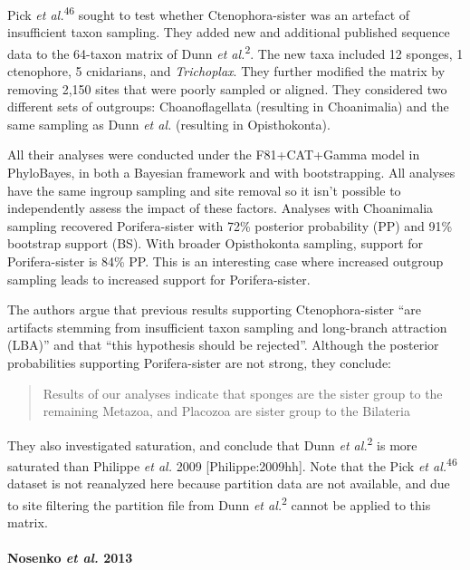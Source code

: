 \documentclass[]{article}
\let\oldparagraph\paragraph
\renewcommand{\paragraph}[1]{\oldparagraph{#1}\mbox{}}
\begin{document}
Pick \emph{et al.}\textsuperscript{46} sought to test whether
Ctenophora-sister was an artefact of insufficient taxon sampling. They
added new and additional published sequence data to the 64-taxon matrix
of Dunn \emph{et al.}\textsuperscript{2}. The new taxa included 12
sponges, 1 ctenophore, 5 cnidarians, and \emph{Trichoplax}. They further
modified the matrix by removing 2,150 sites that were poorly sampled or
aligned. They considered two different sets of outgroups:
Choanoflagellata (resulting in Choanimalia) and the same sampling as
Dunn \emph{et al.} (resulting in Opisthokonta).

All their analyses were conducted under the F81+CAT+Gamma model in
PhyloBayes, in both a Bayesian framework and with bootstrapping. All
analyses have the same ingroup sampling and site removal so it isn't
possible to independently assess the impact of these factors. Analyses
with Choanimalia sampling recovered Porifera-sister with 72\% posterior
probability (PP) and 91\% bootstrap support (BS). With broader
Opisthokonta sampling, support for Porifera-sister is 84\% PP. This is
an interesting case where increased outgroup sampling leads to increased
support for Porifera-sister.

The authors argue that previous results supporting Ctenophora-sister
``are artifacts stemming from insufficient taxon sampling and
long-branch attraction (LBA)'' and that ``this hypothesis should be
rejected''. Although the posterior probabilities supporting
Porifera-sister are not strong, they conclude:

\begin{quote}
Results of our analyses indicate that sponges are the sister group to
the remaining Metazoa, and Placozoa are sister group to the Bilateria
\end{quote}

They also investigated saturation, and conclude that Dunn \emph{et
al.}\textsuperscript{2} is more saturated than Philippe \emph{et al.}
2009 {[}Philippe:2009hh{]}. Note that the Pick \emph{et
al.}\textsuperscript{46} dataset is not reanalyzed here because
partition data are not available, and due to site filtering the
partition file from Dunn \emph{et al.}\textsuperscript{2} cannot be
applied to this matrix.

\hypertarget{nosenko-et-al.-2013}{%
\paragraph{\texorpdfstring{Nosenko \emph{et al.}
2013}{Nosenko et al. 2013}}\label{nosenko-et-al.-2013}}
\end{document}
